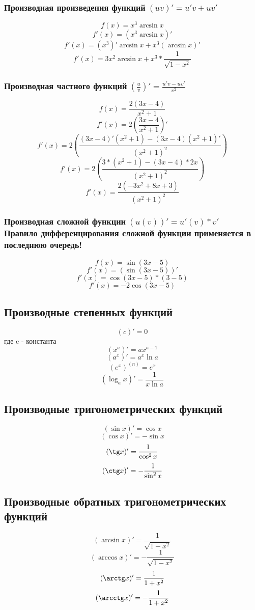 \documentclass[12pt,a4paper]{article}
\begin{document}
\subsubsection{Производная произведения функций$\;(uv)'=u'v+uv'$}
$$f(x)=x^3\arcsin{x}$$
$$f'(x)=(x^3\arcsin{x})'$$
$$f'(x)=(x^3)'\arcsin{x}+x^3(\arcsin{x})'$$
$$f'(x)=3x^2\arcsin{x}+x^3*\frac{1}{\sqrt{1-x^2}}$$
\subsubsection{Производная частного функций$\;(\frac{u}{v})'=\frac{u'v-uv'}{v^2}$}
$$f(x)=\frac{2(3x-4)}{x^2+1}$$
$$f'(x)=2(\frac{3x-4}{x^2+1})'$$
$$f'(x)=2(\frac{(3x-4)'(x^2+1) - (3x-4)(x^2+1)'}{(x^2+1)^2})$$
$$f'(x)=2(\frac{3*(x^2+1)-(3x-4)*2x}{(x^2+1)^2})$$
$$f'(x)=\frac{2(-3x^2+8x+3)}{(x^2+1)^2}$$
\subsubsection{Производная сложной функции$\;(u(v))'=u'(v)*v'$\\Правило дифференцирования сложной функции применяется в последнюю очередь!}
$$f(x)=\sin{(3x-5)}$$
$$f'(x)=(\sin{(3x-5)})'$$
$$f'(x)=\cos{(3x-5)}*(3-5)$$
$$f'(x)=-2\cos{(3x-5)}$$

\subsection{Производные степенных функций}

$$(c)'=0$$
где c - константа
$$(x^a)'=ax^{a-1}$$
$$(a^x)'=a^x\ln a$$
$$(e^x)^{(n)}=e^x$$
$$(\log_{a} x)'=\frac{1}{x\ln a}$$

\subsection{Производные тригонометрических функций}

$$(\sin x)'=\cos x$$
$$(\cos x)'=-\sin x$$
$$(\tg x)'=\frac{1}{\cos^2 x}$$
$$(\ctg x)'=-\frac{1}{\sin^2 x}$$

\subsection{Производные обратных тригонометрических функций}

$$(\arcsin x)'=\frac{1}{\sqrt{1-x^2}}$$
$$(\arccos x)'=-\frac{1}{\sqrt{1-x^2}}$$
$$(\arctg x)'=\frac{1}{1+x^2}$$
$$(\arcctg x)'=-\frac{1}{1+x^2}$$
\end{document}
